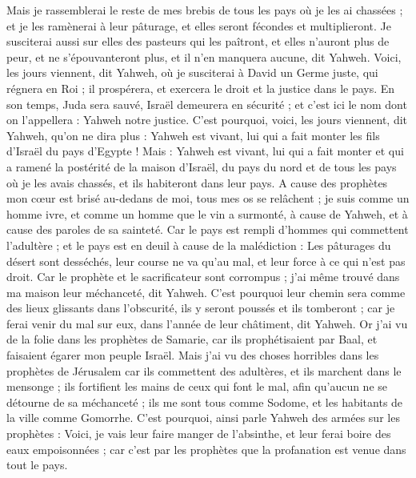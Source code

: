 \begin{multicols}{2}
Mais je rassemblerai le reste de mes brebis de tous les pays où je les ai chassées ; et je les ramènerai à leur pâturage, et elles seront fécondes et multiplieront.
Je susciterai aussi sur elles des pasteurs qui les paîtront, et elles n'auront plus de peur, et ne s'épouvanteront plus, et il n'en manquera aucune, dit Yahweh.
Voici, les jours viennent, dit Yahweh, où je susciterai à David un Germe juste, qui régnera en Roi ; il prospérera, et exercera le droit et la justice dans le pays.
En son temps, Juda sera sauvé, Israël demeurera en sécurité ; et c'est ici le nom dont on l'appellera : Yahweh notre justice.
C'est pourquoi, voici, les jours viennent, dit Yahweh, qu'on ne dira plus : Yahweh est vivant, lui qui a fait monter les fils d'Israël du pays d'Egypte !
Mais : Yahweh est vivant, lui qui a fait monter et qui a ramené la postérité de la maison d'Israël, du pays du nord et de tous les pays où je les avais chassés, et ils habiteront dans leur pays.
A cause des prophètes mon cœur est brisé au-dedans de moi, tous mes os se relâchent ; je suis comme un homme ivre, et comme un homme que le vin a surmonté, à cause de Yahweh, et à cause des paroles de sa sainteté.
Car le pays est rempli d'hommes qui commettent l'adultère ; et le pays est en deuil à cause de la malédiction : Les pâturages du désert sont desséchés, leur course ne va qu'au mal, et leur force à ce qui n'est pas droit.
Car le prophète et le sacrificateur sont corrompus ; j'ai même trouvé dans ma maison leur méchanceté, dit Yahweh.
C'est pourquoi leur chemin sera comme des lieux glissants dans l'obscurité, ils y seront poussés et ils tomberont ; car je ferai venir du mal sur eux, dans l'année de leur châtiment, dit Yahweh.
Or j'ai vu de la folie dans les prophètes de Samarie, car ils prophétisaient par Baal, et faisaient égarer mon peuple Israël.
Mais j'ai vu des choses horribles dans les prophètes de Jérusalem car ils commettent des adultères, et ils marchent dans le mensonge ; ils fortifient les mains de ceux qui font le mal, afin qu'aucun ne se détourne de sa méchanceté ; ils me sont tous comme Sodome, et les habitants de la ville comme Gomorrhe.
C'est pourquoi, ainsi parle Yahweh des armées sur les prophètes : Voici, je vais leur faire manger de l'absinthe, et leur ferai boire des eaux empoisonnées ; car c'est par les prophètes que la profanation est venue dans tout le pays.

\end{multicols}

